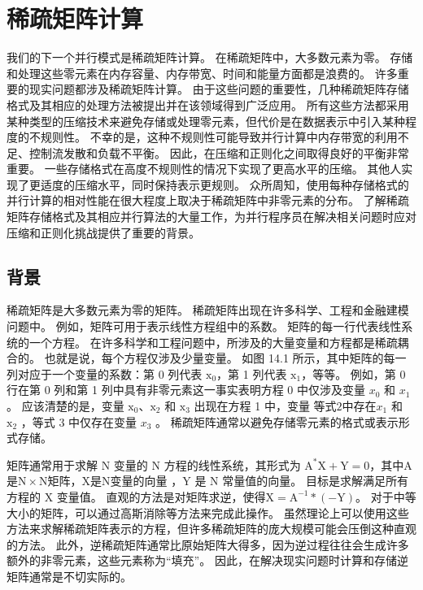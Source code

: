 \section{稀疏矩阵计算}
我们的下一个并行模式是稀疏矩阵计算。 在稀疏矩阵中，大多数元素为零。 存储和处理这些零元素在内存容量、内存带宽、时间和能量方面都是浪费的。 许多重要的现实问题都涉及稀疏矩阵计算。 由于这些问题的重要性，几种稀疏矩阵存储格式及其相应的处理方法被提出并在该领域得到广泛应用。 所有这些方法都采用某种类型的压缩技术来避免存储或处理零元素，但代价是在数据表示中引入某种程度的不规则性。 不幸的是，这种不规则性可能导致并行计算中内存带宽的利用不足、控制流发散和负载不平衡。 因此，在压缩和正则化之间取得良好的平衡非常重要。 一些存储格式在高度不规则性的情况下实现了更高水平的压缩。 其他人实现了更适度的压缩水平，同时保持表示更规则。 众所周知，使用每种存储格式的并行计算的相对性能在很大程度上取决于稀疏矩阵中非零元素的分布。 了解稀疏矩阵存储格式及其相应并行算法的大量工作，为并行程序员在解决相关问题时应对压缩和正则化挑战提供了重要的背景。

\subsection{背景}
稀疏矩阵是大多数元素为零的矩阵。 稀疏矩阵出现在许多科学、工程和金融建模问题中。 例如，矩阵可用于表示线性方程组中的系数。 矩阵的每一行代表线性系统的一个方程。 在许多科学和工程问题中，所涉及的大量变量和方程都是稀疏耦合的。 也就是说，每个方程仅涉及少量变量。 如图 14.1 所示，其中矩阵的每一列对应于一个变量的系数：第 0 列代表 $\mathrm{x}_{0}$，第 1 列代表 $\mathrm{x}_{1 }$，等等。 例如，第 0 行在第 0 列和第 1 列中具有非零元素这一事实表明方程 0 中仅涉及变量 $x_{0}$ 和 $x_{1}$ 。 应该清楚的是，变量 $\mathrm{x}_{0}、\mathrm{x}_{2}$ 和 $\mathrm{x}_{3}$ 出现在方程 1 中，变量 $\mathrm 等式 2 中存在 {x}_{1}$ 和 $\mathrm{x}_{2}$ ，等式 3 中仅存在变量 $x_{3}$ 。 稀疏矩阵通常以避免存储零元素的格式或表示形式存储。

矩阵通常用于求解 $\mathrm{N}$ 变量的 $\mathrm{N}$ 方程的线性系统，其形式为 $\mathrm{A}^{*} \mathrm{X}+\mathrm{Y }=0$，其中$\mathrm{A}$是$\mathrm{N} \times \mathrm{N}$矩阵，$\mathrm{X}$是$\mathrm{N}$变量的向量 ，$\mathrm{Y}$ 是 $\mathrm{N}$ 常量值的向量。 目标是求解满足所有方程的 $\mathrm{X}$ 变量值。 直观的方法是对矩阵求逆，使得$\mathrm{X}=\mathrm{A}^{-1} *(-\mathrm{Y})$。 对于中等大小的矩阵，可以通过高斯消除等方法来完成此操作。 虽然理论上可以使用这些方法来求解稀疏矩阵表示的方程，但许多稀疏矩阵的庞大规模可能会压倒这种直观的方法。 此外，逆稀疏矩阵通常比原始矩阵大得多，因为逆过程往往会生成许多额外的非零元素，这些元素称为“填充”。 因此，在解决现实问题时计算和存储逆矩阵通常是不切实际的。

